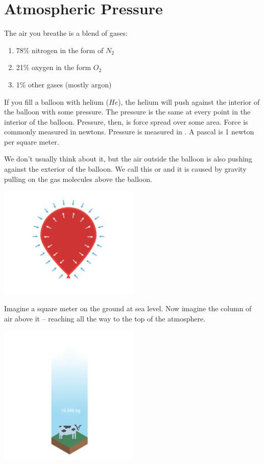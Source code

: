 \chapter{Atmospheric Pressure}

The air you breathe is a blend of gases:
\begin{enumerate}
\item 78\% nitrogen in the form of $N_2$
\item 21\% oxygen in the form $O_2$
\item 1\% other gases (mostly argon)
\end{enumerate}

If you fill a balloon with helium ($He$),  the helium will push against the interior of the balloon with some pressure.   
The pressure is the same at every point in the interior of the balloon.  Pressure,  then,  is force spread over some area.   
Force is commonly measured in newtons.   Pressure is measured in .  A pascal is 1 newton per square meter.

We don't usually think about it,  but the air outside the balloon is also pushing against the exterior of the balloon.  
We call this  or  and it is caused by gravity pulling on the gas molecules above the balloon.

\includegraphics[width=0.5\textwidth]{balloon.png}


Imagine a square meter on the ground at sea level.  Now imagine the column of air above it -- reaching all the way to the top of the atmosphere.

\includegraphics[width=0.5\textwidth]{aircolumn.png}

